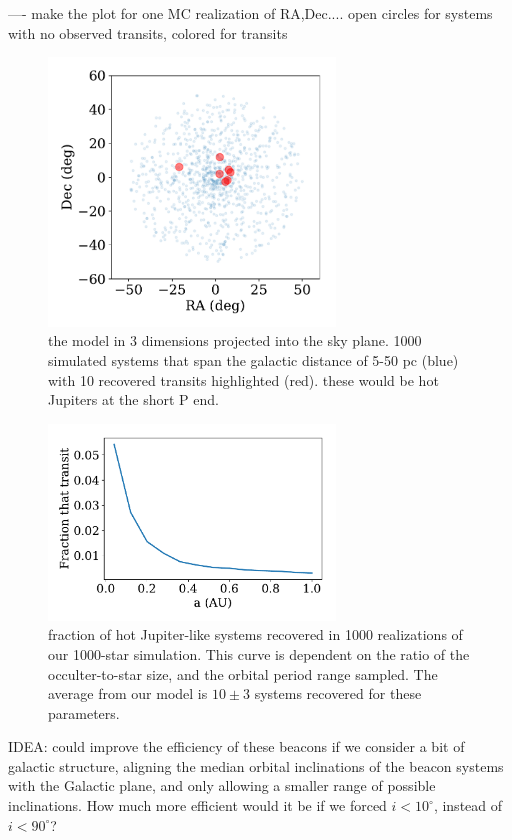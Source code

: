 \documentclass[twocolumn]{aastex62}
\begin{document}
---- make the plot for one MC realization of RA,Dec.... open circles for systems with no observed transits, colored for transits

\begin{figure}[]
\centering
\includegraphics[width=3in]{../figures/3d_model.pdf}
\caption{the model in 3 dimensions projected into the sky plane. 1000 simulated systems that span the galactic distance of 5-50 pc (blue) with 10 recovered transits highlighted (red). these would be hot Jupiters at the short P end.}
\label{fig:3d}
\end{figure}

\begin{figure}[]
\centering
\includegraphics[width=3in]{../figures/recov_fraction.pdf}
\caption{fraction of hot Jupiter-like systems recovered in 1000 realizations of our 1000-star simulation. This curve is dependent on the ratio of the occulter-to-star size, and the orbital period range sampled.
The average from our model is $10\pm 3$ systems recovered for these parameters.}
\label{fig:recov}
\end{figure}


IDEA:
could improve the efficiency of these beacons if we consider a bit of galactic structure, aligning the median orbital inclinations of the beacon systems with the Galactic plane, and only allowing a smaller range of possible inclinations. How much more efficient would it be if we forced $i<10^\circ$, instead of $i<90^\circ$?
\end{document}
